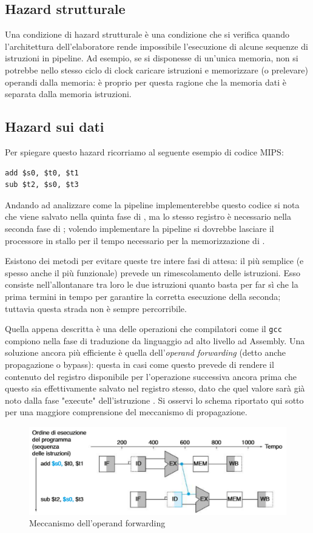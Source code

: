 \documentclass[class=book, crop=false, oneside]{standalone}
\begin{document}
\subsection{Hazard strutturale}
Una condizione di hazard strutturale è una condizione che si verifica quando l'architettura dell’elaboratore rende impossibile l’esecuzione di alcune sequenze di istruzioni in pipeline. Ad esempio, se si disponesse di un'unica memoria, non si potrebbe nello stesso ciclo di clock caricare istruzioni e memorizzare (o prelevare) operandi dalla memoria: è proprio per questa ragione che la memoria dati è separata dalla memoria istruzioni.

\subsection{Hazard sui dati}
Per spiegare questo hazard ricorriamo al seguente esempio di codice MIPS:
\begin{verbatim}
add $s0, $t0, $t1
sub $t2, $s0, $t3
\end{verbatim}
Andando ad analizzare come la pipeline implementerebbe questo codice si nota che  viene salvato nella quinta fase di , ma lo stesso registro è necessario nella seconda fase di ; volendo implementare la pipeline si dovrebbe lasciare il processore in stallo per il tempo necessario per la memorizzazione di .

Esistono dei metodi per evitare queste tre intere fasi di attesa: il più semplice (e spesso anche il più funzionale) prevede un rimescolamento delle istruzioni. Esso consiste nell'allontanare tra loro le due istruzioni quanto basta per far sì che la prima termini in tempo per garantire la corretta esecuzione della seconda; tuttavia questa strada non è sempre percorribile.

Quella appena descritta è una delle operazioni che compilatori come il \texttt{gcc} compiono nella fase di traduzione da linguaggio ad alto livello ad Assembly. Una soluzione ancora più efficiente è quella dell'\emph{operand forwarding} (detto anche propagazione o bypass): questa in casi come questo prevede di rendere il contenuto del registro  disponibile per l'operazione successiva ancora prima che questo sia effettivamente salvato nel registro stesso, dato che quel valore sarà già noto dalla fase "execute" dell'istruzione .
Si osservi lo schema riportato qui sotto per una maggiore comprensione del meccanismo di propagazione.
\begin{figure}[H]
	\centering
	\includegraphics[width=.8\textwidth,keepaspectratio]{propagazione.png}
	\caption{Meccanismo dell'operand forwarding}
\end{figure}
\end{document}
